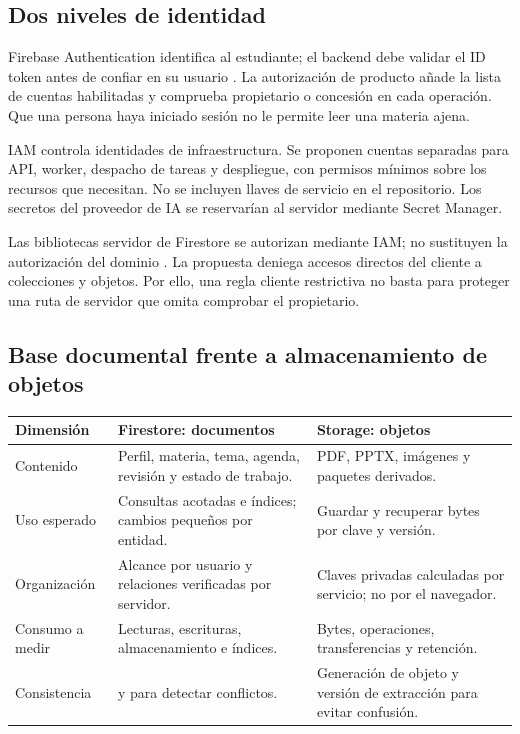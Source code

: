 \subsection{Dos niveles de identidad}
Firebase Authentication identifica al estudiante; el backend debe validar el ID token antes de confiar en su usuario \cite{firebase-token}. La autorización de producto añade la lista de cuentas habilitadas y comprueba propietario o concesión en cada operación. Que una persona haya iniciado sesión no le permite leer una materia ajena.

IAM controla identidades de infraestructura. Se proponen cuentas separadas para API, worker, despacho de tareas y despliegue, con permisos mínimos sobre los recursos que necesitan. No se incluyen llaves de servicio en el repositorio. Los secretos del proveedor de IA se reservarían al servidor mediante Secret Manager.

Las bibliotecas servidor de Firestore se autorizan mediante IAM; no sustituyen la autorización del dominio \cite{firestore-iam}. La propuesta deniega accesos directos del cliente a colecciones y objetos. Por ello, una regla cliente restrictiva no basta para proteger una ruta de servidor que omita comprobar el propietario.

\subsection{Base documental frente a almacenamiento de objetos}
\begin{tabularx}{\linewidth}{P{2.4cm}Y Y}
\toprule
\textbf{Dimensión} & \textbf{Firestore: documentos} & \textbf{Storage: objetos}\\
\midrule
Contenido & Perfil, materia, tema, agenda, revisión y estado de trabajo. & PDF, PPTX, imágenes y paquetes derivados.\\
Uso esperado & Consultas acotadas e índices; cambios pequeños por entidad. & Guardar y recuperar bytes por clave y versión.\\
Organización & Alcance por usuario y relaciones verificadas por servidor. & Claves privadas calculadas por servicio; no por el navegador.\\
Consumo a medir & Lecturas, escrituras, almacenamiento e índices. & Bytes, operaciones, transferencias y retención.\\
Consistencia &  y  para detectar conflictos. & Generación de objeto y versión de extracción para evitar confusión.\\
\bottomrule
\end{tabularx}

